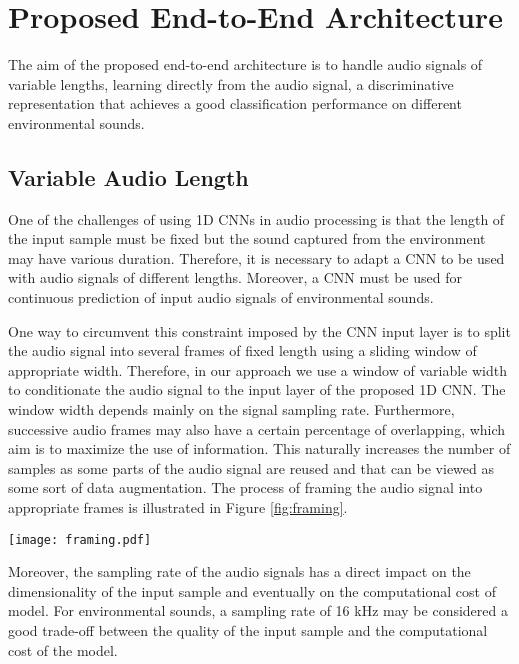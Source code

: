 \documentclass[preprint,final,12pt]{elsarticle}
\begin{document}
\section{Proposed End-to-End Architecture}
\label{sec:arch}
The aim of the proposed end-to-end architecture is to handle audio signals of variable lengths, learning directly from the audio signal, a discriminative representation that achieves a good classification performance on different environmental sounds. 

\subsection{Variable Audio Length}
\label{sub:audiolengths}
One of the challenges of using 1D CNNs in audio processing is that the length of the input sample must be fixed but the sound captured from the environment may have various duration. Therefore, it is necessary to adapt a CNN to be used with audio signals of different lengths. Moreover, a CNN must be used for continuous prediction of input audio signals of environmental sounds.

One way to circumvent this constraint imposed by the CNN input layer is to split the audio signal into several frames of fixed length using a sliding window of appropriate width. Therefore, in our approach we use a window of variable width to conditionate the audio signal to the input layer of the proposed 1D CNN. The window width depends mainly on the signal sampling rate. Furthermore, successive audio frames may also have a certain percentage of overlapping, which aim is to maximize the use of information. This naturally increases the number of samples as some parts of the audio signal are reused and that can be viewed as some sort of data augmentation. The process of framing the audio signal into appropriate frames is illustrated in Figure \ref{fig:framing}.


\begin{figure*}[htpb!]
  \centering
  \texttt{[image: framing.pdf]}
  \caption{Framing the input audio signal into several frames ($s, s+1$) with appropriate overlapping percentage ($50\%)$.}
  \label{fig:framing}
\end{figure*}


Moreover, the sampling rate of the audio signals has a direct impact on the dimensionality of the input sample and eventually on the computational cost of model. For environmental sounds, a sampling rate of 16 kHz may be considered a good trade-off between the quality of the input sample and the computational cost of the model. 
\end{document}

